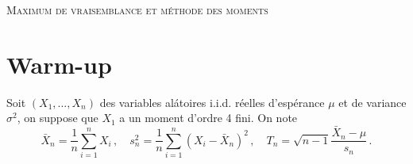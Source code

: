\documentclass[a4paper,10pt,fleqn]{article}
\newcommand{\1}{\ensuremath{\mathbbm{1}}}
\begin{document}


\noindent\hrulefill

\begin{center}
\textsc{Maximum de vraisemblance et m\'ethode des moments}
\end{center}
\hrulefill

\medskip

\section*{Warm-up}

Soit $(X_1,\ldots,X_n)$ des variables al\'atoires i.i.d. r\'eelles d'esp\'erance $\mu$ et de variance $\sigma^2$, on suppose que $X_1$ a un moment d'ordre 4 fini. On note
\begin{equation*}
\bar X_n = \frac{1}{n}\sum_{i=1}^n X_i\,, \quad s^2_n = \frac{1}{n}\sum_{i=1}^n (X_i-\bar X_n)^2\,, \quad T_n = \sqrt{n-1}\frac{\bar X_n - \mu}{s_n}\,.
\end{equation*}
\end{document}
